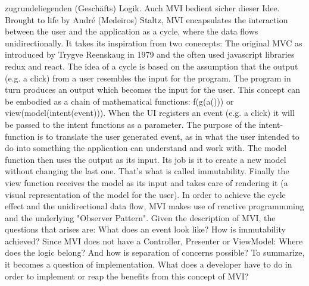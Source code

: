 zugrundeliegenden (Geschäfts) Logik. Auch MVI bedient sicher dieser Idee.
Brought to life by André (Medeiros) Staltz, MVI encapsulates the interaction between the user and the application as a cycle, where the data flows unidirectionally.
It takes its inspiration from two conecepts: The original MVC as introduced by Trygve Reenskaug in 1979 \cite{wikipediaTrygveReenskaug} and the often used javascript libraries redux and react. 
The idea of a cycle is based on the assumption that the output (e.g. a click) from a user resembles the input for the program. The program in turn produces an output 
which becomes the input for the user. This concept can be embodied as a chain of mathematical functions: f(g(a())) or view(model(intent(event))).
When the UI registers an event (e.g. a click) it will be passed to the intent functions as a parameter. The purpose of the intent-function is 
to translate the user generated event, as in what the user intended to do into something the application can understand and work with.
The model function then uses the output as its input. Its job is it to create a new model without changing the last one. That's what is called immutability.
Finally the view function receives the model as its input and takes care of rendering it (a visual representation of the model for the user). 
In order to achieve the cycle effect and the unidirectional data flow, MVI makes use of reactive programmming and the underlying "Observer Pattern".
Given the description of MVI, the questions that arises are: What does an event look like? How is immutability achieved?
Since MVI does not have a Controller, Presenter or ViewModel: Where does the logic belong? And how is separation of concerns possible?
To summarize, it becomes a question of implementation. What does a developer have to do in order to implement or reap the benefits from this concept of MVI?

